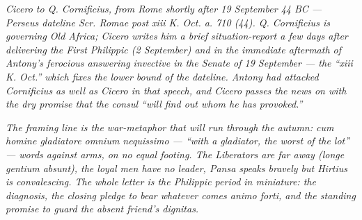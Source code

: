 
\textit{Cicero to Q. Cornificius, from Rome shortly after 19 September
44 BC --- Perseus dateline \textit{Scr. Romae post xiii K. Oct. a.
710 (44)}. Q. Cornificius is governing Old Africa; Cicero writes him
a brief situation-report a few days after delivering the First
Philippic (2 September) and in the immediate aftermath of Antony's
ferocious answering invective in the Senate of 19 September --- the
``xiii K. Oct.'' which fixes the lower bound of the dateline. Antony
had attacked Cornificius as well as Cicero in that speech, and Cicero
passes the news on with the dry promise that the consul ``will find
out whom he has provoked.''}

\textit{The framing line is the war-metaphor that will run through
the autumn: \textit{cum homine gladiatore omnium nequissimo} ---
``with a gladiator, the worst of the lot'' --- words against arms,
on no equal footing. The Liberators are far away (\textit{longe
gentium absunt}), the loyal men have no leader, Pansa speaks bravely
but Hirtius is convalescing. The whole letter is the Philippic
period in miniature: the diagnosis, the closing pledge to bear
whatever comes \textit{animo forti}, and the standing promise to
guard the absent friend's \textit{dignitas}.}
